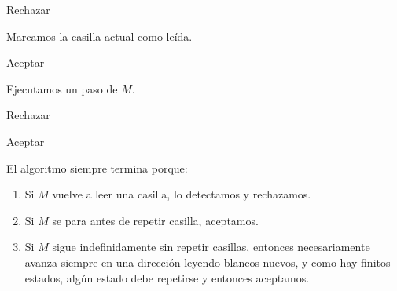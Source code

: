 \begin{ejercicio}
\begin{itemize}
\begin{algorithm}
\begin{algorithmic}
                    \State Rechazar
                \EndIf

                \State Marcamos la casilla actual como leída.

                    \State Aceptar
                \EndIf

                \State Ejecutamos un paso de $M$.

                    \State Rechazar
                \EndIf

                    \State Aceptar
                \EndIf
            \EndWhile
            \end{algorithmic}
        \end{algorithm}

        El algoritmo siempre termina porque:
        \begin{enumerate}
            \item Si $M$ vuelve a leer una casilla, lo detectamos y rechazamos.
            \item Si $M$ se para antes de repetir casilla, aceptamos.
            \item Si $M$ sigue indefinidamente sin repetir casillas, 
            entonces necesariamente avanza siempre en una dirección leyendo blancos nuevos, 
            y como hay finitos estados, algún estado debe repetirse y entonces aceptamos.
        \end{enumerate}

    \end{itemize}
\end{ejercicio}




